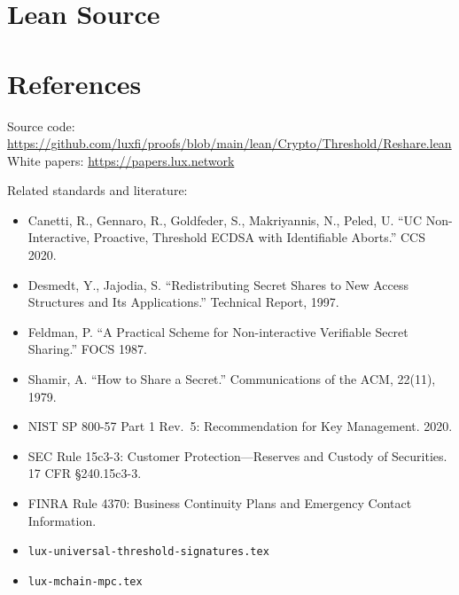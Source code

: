 \documentclass[11pt]{article}
\begin{document}
\section{Lean Source}


\section{References}
\noindent Source code: \url{https://github.com/luxfi/proofs/blob/main/lean/Crypto/Threshold/Reshare.lean}\\
\noindent White papers: \url{https://papers.lux.network}

\noindent Related standards and literature:
\begin{itemize}
  \item Canetti, R., Gennaro, R., Goldfeder, S., Makriyannis, N., Peled, U. ``UC Non-Interactive, Proactive, Threshold ECDSA with Identifiable Aborts.'' CCS 2020.
  \item Desmedt, Y., Jajodia, S. ``Redistributing Secret Shares to New Access Structures and Its Applications.'' Technical Report, 1997.
  \item Feldman, P. ``A Practical Scheme for Non-interactive Verifiable Secret Sharing.'' FOCS 1987.
  \item Shamir, A. ``How to Share a Secret.'' Communications of the ACM, 22(11), 1979.
  \item NIST SP 800-57 Part 1 Rev.~5: Recommendation for Key Management. 2020.
  \item SEC Rule 15c3-3: Customer Protection---Reserves and Custody of Securities. 17 CFR \S 240.15c3-3.
  \item FINRA Rule 4370: Business Continuity Plans and Emergency Contact Information.
  \item \texttt{lux-universal-threshold-signatures.tex}
  \item \texttt{lux-mchain-mpc.tex}
\end{itemize}
\end{document}

